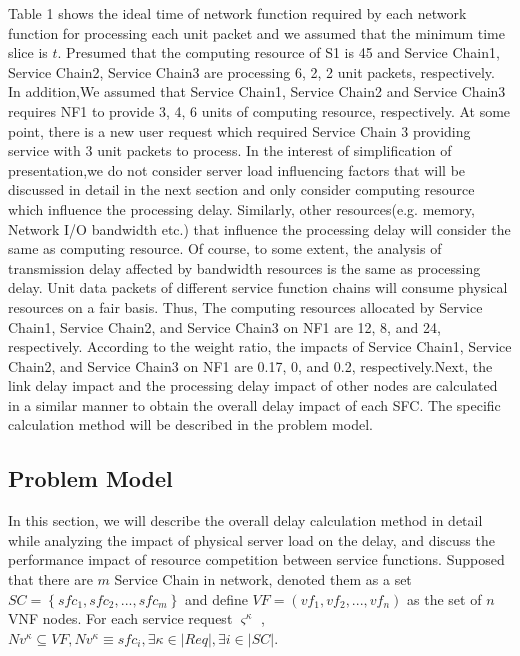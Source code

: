 \documentclass{ieeeaccess}
\begin{document}
Table 1 shows the ideal time of network function required by each network function for processing each unit packet and we assumed that the minimum time slice is $t$. Presumed that the computing resource of S1 is 45 and Service Chain1, Service Chain2, Service Chain3 are processing 6, 2, 2 unit packets, respectively. In addition,We assumed that Service Chain1, Service Chain2 and Service Chain3 requires NF1 to provide 3, 4, 6 units of computing resource, respectively. At some point, there is a new user request which required Service Chain 3 providing service with 3 unit packets to process. In the interest of simplification of presentation,we do not consider server load influencing factors that will be discussed in detail in the next section and only consider computing resource which influence the processing delay. Similarly, other resources(e.g. memory, Network I/O bandwidth etc.) that influence the processing delay will consider the same as computing resource. Of course, to some extent, the analysis of transmission delay affected by bandwidth resources is the same as processing delay. Unit data packets of different service function chains will consume physical resources on a fair basis. Thus, The computing resources allocated by Service Chain1, Service Chain2, and Service Chain3 on NF1 are 12, 8, and 24, respectively. According to the weight ratio, the impacts of Service Chain1, Service Chain2, and Service Chain3 on NF1 are 0.17, 0, and 0.2, respectively.Next, the link delay impact and the processing delay impact of other nodes are calculated in a similar manner to obtain the overall delay impact of each SFC. The specific calculation method will be described in the problem model.

\subsection{Problem Model}
In this section, we will describe the overall delay calculation method in detail while analyzing the impact of physical server load on the delay, and discuss the performance impact of resource competition between service functions. Supposed that there are $m$ Service Chain in network, denoted them as a set $SC=\left \{ sfc_{1},sfc_{2},...,sfc_{m} \right \}$ and define $VF=\left ( vf_{1},vf_{2},...,vf_{n} \right )$ as the  set of $n$ VNF nodes. For each service request ${\varsigma}^{\kappa}$ ,$Nv^{\kappa}\subseteq VF,Nv^{\kappa}\equiv sfc_{i},\exists {\kappa} \in |Req|,\exists i \in |SC|$.
\end{document}
